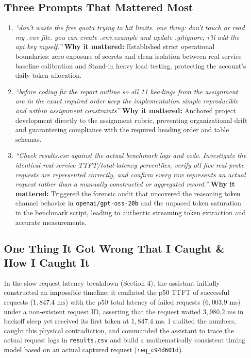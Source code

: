\documentclass[9pt,a4paper]{article}
\begin{document}
\subsection*{Three Prompts That Mattered Most}
\begin{enumerate}
    \item \textit{``don't waste the free quota trying to hit limits. one thing: don't touch or read my .env file. you can create .env.example and update .gitignore; i'll add the api key myself.''}  
    \textbf{Why it mattered:} Established strict operational boundaries: zero exposure of secrets and clean isolation between real service baseline calibration and Stand-in heavy load testing, protecting the account's daily token allocation.
    \item \textit{``before coding fix the report outline so all 11 headings from the assignment are in the exact required order keep the implementation simple reproducible and within assignment constraints''}  
    \textbf{Why it mattered:} Anchored project development directly to the assignment rubric, preventing organizational drift and guaranteeing compliance with the required heading order and table schemas.
    \item \textit{``Check results.csv against the actual benchmark logs and code. Investigate the identical real-service TTFT/total-latency percentiles, verify all five real probe requests are represented correctly, and confirm every row represents an actual request rather than a manually constructed or aggregated record.''}  
    \textbf{Why it mattered:} Triggered the forensic audit that uncovered the reasoning token channel behavior in \texttt{openai/gpt-oss-20b} and the unpaced token saturation in the benchmark script, leading to authentic streaming token extraction and accurate measurements.
\end{enumerate}

\subsection*{One Thing It Got Wrong That I Caught \& How I Caught It}
In the slow-request latency breakdown (Section 4), the assistant initially constructed an impossible timeline: it conflated the p50 TTFT of successful requests ($1,847.4\text{ ms}$) with the p50 total latency of failed requests ($6,003.9\text{ ms}$) under a non-existent request ID, asserting that the request waited $3,980.2\text{ ms}$ in backoff sleep yet received its first token at $1,847.4\text{ ms}$. I audited the numbers, caught this physical contradiction, and commanded the assistant to trace the actual request logs in \texttt{results.csv} and build a mathematically consistent timing model based on an actual captured request (\texttt{req\_c94d601d}).
\end{document}
